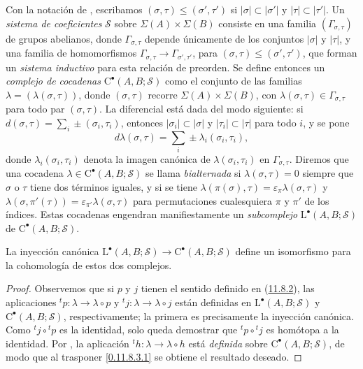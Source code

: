 \begin{env}[11.8.4]
\label{0.11.8.4}
\label{0.11.8.4-fr}
Con la notación de , escribamos
$(\sigma,\tau)\leq(\sigma',\tau')$
si $|\sigma|\subset|\sigma'|$ y $|\tau|\subset|\tau'|$.
Un \emph{sistema de coeficientes} $\mathscr S$ sobre
$\Sigma(A)\times\Sigma(B)$ consiste en una familia
$(\Gamma_{\sigma,\tau})$ de grupos abelianos, donde
$\Gamma_{\sigma,\tau}$ depende únicamente de los conjuntos $|\sigma|$ y
$|\tau|$, y una familia de homomorfismos $\Gamma_{\sigma,\tau}\longrightarrow\Gamma_{\sigma',\tau'}$, para $(\sigma,\tau)\leq(\sigma',\tau')$, que forman un \emph{sistema inductivo} para esta relación de preorden. Se define entonces un \emph{complejo de cocadenas} $\mathrm C^\bullet(A,B;\mathscr S)$ como el conjunto de las familias $\lambda=(\lambda(\sigma,\tau))$, donde $(\sigma,\tau)$ recorre $\Sigma(A)\times\Sigma(B)$, con $\lambda(\sigma,\tau)\in\Gamma_{\sigma,\tau}$ para todo par $(\sigma,\tau)$. La diferencial está dada del modo siguiente: si
$d(\sigma,\tau)=\sum_i\pm(\sigma_i,\tau_i)$,
entonces $|\sigma_i|\subset|\sigma|$ y $|\tau_i|\subset|\tau|$ para todo
$i$, y se pone
\[
d\lambda(\sigma,\tau)=\sum_i\pm\lambda_i(\sigma_i,\tau_i),
\]
donde $\lambda_i(\sigma_i,\tau_i)$ denota la imagen canónica de
$\lambda(\sigma_i,\tau_i)$ en $\Gamma_{\sigma,\tau}$. Diremos que una cocadena $\lambda\in\mathrm C^\bullet(A,B;\mathscr S)$ se llama
\emph{bialternada} si $\lambda(\sigma,\tau)=0$ siempre que $\sigma$
o $\tau$ tiene dos términos iguales, y si se tiene $\lambda(\pi(\sigma),\tau)=\varepsilon_\pi\lambda(\sigma,\tau)$ y $\lambda(\sigma,\pi'(\tau))=\varepsilon_{\pi'}\lambda(\sigma,\tau)$ para permutaciones cualesquiera $\pi$ y $\pi'$ de los índices.
Estas cocadenas engendran manifiestamente un \emph{subcomplejo}
$\mathrm L^\bullet(A,B;\mathscr S)$ de
$\mathrm C^\bullet(A,B;\mathscr S)$.
\end{env}

\begin{proposition}[11.8.5]
\label{0.11.8.5-fr}
{La inyección canónica
$\mathrm L^\bullet(A,B;\mathscr S)\longrightarrow\mathrm C^\bullet(A,B;\mathscr S)$
define un isomorfismo para la cohomología de estos dos complejos.}
\end{proposition}

\begin{proof}
Observemos que si $p$ y $j$ tienen el sentido definido en (\hyperref[0.11.8.2-fr]{11.8.2}), las aplicaciones ${}^tp:\lambda\to\lambda\circ p$ y ${}^tj:\lambda\to\lambda\circ j$ están definidas en $\mathrm L^\bullet(A,B;\mathscr S)$ y
$\mathrm C^\bullet(A,B;\mathscr S)$, respectivamente; la primera es precisamente
la inyección canónica.
Como ${}^tj\circ{}^tp$ es la identidad, solo queda demostrar
que ${}^tp\circ{}^tj$ es homótopa a la identidad.
Por , la aplicación
${}^th:\lambda\to\lambda\circ h$
está \emph{definida} sobre $\mathrm C^\bullet(A,B;\mathscr S)$, de modo que al trasponer
\eqref{0.11.8.3.1} se obtiene el resultado deseado.
\end{proof}

